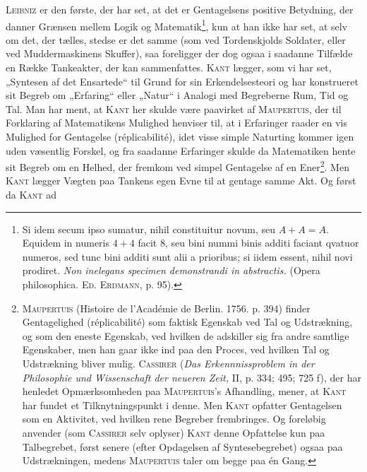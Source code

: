 \documentclass[12pt]{article}
\begin{document}
\textsc{Leibniz} er den første, der har set, at det er Gentagelsens positive
Betydning, der danner Grænsen mellem Logik og Matematik\footnote{Si idem secum
ipso sumatur, nihil constituitur novum, seu $A + A = A$. Equidem in numeris
$4 + 4$ facit 8, seu bini nummi binis additi faciant qvatuor numeros, sed tunc
bini additi sunt alii a prioribus; si iidem essent, nihil novi prodiret.
\textit{Non inelegans specimen demonstrandi in abstractis.} (Opera
philosophica. \textsc{Ed. Erdmann}, p. 95).}, kun at han ikke har set, at selv
om det, der tælles, stedse er det samme (som ved Tordenskjolds Soldater, eller
ved Muddermaskinens Skuffer), saa foreligger der dog ogsaa i saadanne
Tilfælde en Række Tankeakter, der kan sammenfattes. \textsc{Kant} lægger, som
vi har set, „Syntesen af det Ensartede“ til Grund for sin Erkendelsesteori og
har konstrueret sit Begreb om „Erfaring“ eller „Natur“ i Analogi med
Begreberne Rum, Tid og Tal. Man har ment, at \textsc{Kant} her skulde være
paavirket af \textsc{Maupertuis}, der til Forklaring af
Matematikens Mulighed henviser til, at i Erfaringer raader en vis Mulighed for
Gentagelse (réplicabilité), idet visse simple Naturting kommer igen uden
væsentlig Forskel, og fra saadanne Erfaringer skulde da Matematiken hente sit
Begreb om en Helhed, der fremkom ved simpel Gentagelse af en
Ener\footnote{\textsc{Maupertuis} (Histoire de l'Académie de Berlin. 1756.
p. 394) finder Gentagelighed (réplicabilité) som faktisk Egenskab ved Tal og
Udstrækning, og som den eneste Egenskab, ved hvilken de adskiller sig fra
andre samtlige Egenskaber, men han gaar ikke ind paa den Proces, ved hvilken
Tal og Udstrækning bliver mulig. \textsc{Cassirer}
(\textit{Das Erkennnissproblem in der Philosophie und Wissenschaft der neueren
Zeit,} II, p. 334; 495; 725 f), der har henledet Opmærksomheden paa
\textsc{Maupertuis}'s Afhandling, mener, at \textsc{Kant} har fundet et
Tilknytningspunkt i denne. Men \textsc{Kant} opfatter Gentagelsen som en
Aktivitet, ved hvilken rene Begreber frembringes. Og foreløbig anvender (som
\textsc{Cassirer} selv oplyser) \textsc{Kant} denne Opfattelse kun paa
Talbegrebet, først senere (efter Opdagelsen af Syntesebegrebet) ogsaa paa
Udstrækningen, medens \textsc{Maupertuis} taler om begge paa én Gang.}. Men
\textsc{Kant} lægger Vægten paa Tankens egen Evne til at gentage samme Akt. Og
først da \textsc{Kant} ad
\end{document}
